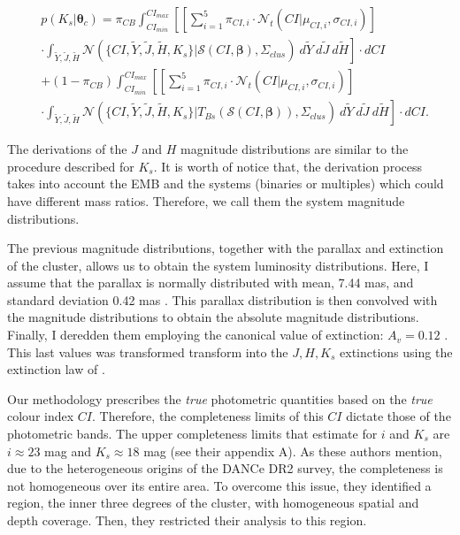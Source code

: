 \begin{align}
&p(K_s | \boldsymbol{\theta}_c)  =   \pi_{CB} \int_{CI_{min}}^{CI_{max}}\left[ \left[\sum_{i=1}^5 \pi_{CI,i} \cdot \mathcal{N}_t(CI| \mu_{CI,i},\sigma_{CI,i})\right]\right. \nonumber \\
&\cdot  \left.\int_{\tilde{Y},\tilde{J},\tilde{H}}\mathcal{N}(\{CI,\tilde{Y},\tilde{J},\tilde{H},K_s\}|\boldsymbol{\mathcal{S}}(CI, \boldsymbol{\beta}),\Sigma_{clus})~d\tilde{Y}~d\tilde{J}~d\tilde{H}\right] \cdot dCI \nonumber \\
& + (1-\pi_{CB}) \int_{CI_{min}}^{CI_{max}}\left[\left[\sum_{i=1}^5 \pi_{CI,i} \cdot \mathcal{N}_t(CI| \mu_{CI,i},\sigma_{CI,i})\right]\right.\nonumber\\
&\cdot \left. \int_{\tilde{Y},\tilde{J},\tilde{H}}\mathcal{N}(\{CI,\tilde{Y},\tilde{J},\tilde{H},K_s\}|T_{Bs}(\boldsymbol{\mathcal{S}}(CI, \boldsymbol{\beta})),\Sigma_{clus})~d\tilde{Y}~d\tilde{J}~d\tilde{H}\right]\cdot dCI. \nonumber 
\end{align}

The derivations of the $J$ and $H$ magnitude distributions are similar to the procedure described for $K_s$. It is worth of notice that, the derivation process takes into account the EMB and the systems (binaries or multiples) which could have different mass ratios. Therefore, we call them the system magnitude distributions. 

The previous magnitude distributions, together with the parallax and extinction of the cluster, allows us to obtain the system luminosity distributions. Here, I assume that the parallax is normally distributed with mean, 7.44 mas, and standard deviation 0.42 mas \citep{Galli2017}. This parallax distribution is then convolved with the magnitude distributions to obtain the absolute magnitude distributions. Finally, I deredden them employing the canonical value of extinction: $A_v=0.12$ \citep{Guthrie1987}. This last values was transformed transform into the $J,H,K_s$ extinctions using the extinction law of \citet{Cardelli1989}.

Our methodology prescribes the \emph{true} photometric quantities based on the \emph{true} colour index $CI$. Therefore, the completeness limits of this $CI$ dictate those of the photometric bands. The upper completeness limits that \citet{Bouy2015} estimate for $i$ and $K_s$ are $i\approx23$ mag and $K_s\approx18$ mag (see their appendix A). As these authors mention, due to the heterogeneous origins of the DANCe DR2 survey, the completeness is not homogeneous over its entire area. To overcome this issue, they identified a region, the inner three degrees of the cluster, with homogeneous spatial and depth coverage. Then, they restricted their analysis to this region. 

